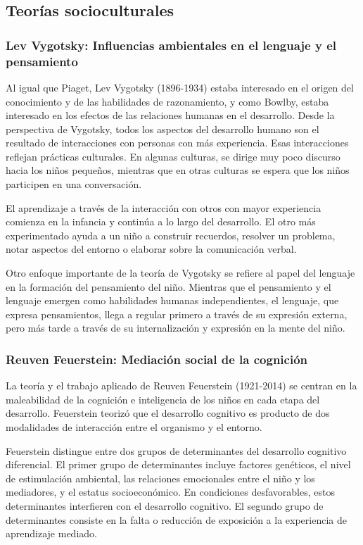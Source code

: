 \documentclass[11pt,letterpaper]{report}
\begin{document}
\subsection{Teorías socioculturales}
\subsubsection{Lev Vygotsky: Influencias ambientales en el lenguaje y el pensamiento}
Al igual que Piaget, Lev Vygotsky (1896-1934) estaba interesado en el origen
del conocimiento y de las habilidades de razonamiento, y como Bowlby, estaba
interesado en los efectos de las relaciones humanas en el desarrollo. Desde la
perspectiva de Vygotsky, todos los aspectos del desarrollo humano son el
resultado de interacciones con personas con más experiencia. Esas interacciones
reflejan prácticas culturales. En algunas culturas, se dirige muy poco discurso
hacia los niños pequeños, mientras que en otras culturas se espera que los
niños participen en una conversación. \cite{Feldman3}

El aprendizaje a través de la interacción con otros con mayor experiencia
comienza en la infancia y continúa a lo largo del desarrollo. El otro más
experimentado ayuda a un niño a construir recuerdos, resolver un problema, notar
aspectos del entorno o elaborar sobre la comunicación verbal. \cite{Feldman3}

Otro enfoque importante de la teoría de Vygotsky se refiere al papel del
lenguaje en la formación del pensamiento del niño. Mientras que el pensamiento
y el lenguaje emergen como habilidades humanas independientes, el lenguaje, que
expresa pensamientos, llega a regular primero a través de su expresión externa,
pero más tarde a través de su internalización y expresión en la mente del niño.
\cite{Feldman3}

\subsubsection{Reuven Feuerstein: Mediación social de la cognición}
La teoría y el trabajo aplicado de Reuven Feuerstein (1921-2014) se centran en
la maleabilidad de la cognición e inteligencia de los niños en cada etapa del
desarrollo. Feuerstein teorizó que el desarrollo cognitivo es producto de dos
modalidades de interacción entre el organismo y el entorno. \cite{Feldman3}

Feuerstein distingue entre dos grupos de determinantes del desarrollo cognitivo
diferencial. El primer grupo de determinantes incluye factores genéticos, el
nivel de estimulación ambiental, las relaciones emocionales entre el niño y los
mediadores, y el estatus socioeconómico. En condiciones desfavorables, estos
determinantes interfieren con el desarrollo cognitivo. El segundo grupo de
determinantes consiste en la falta o reducción de exposición a la experiencia
de aprendizaje mediado. \cite{Feldman3}
\end{document}

